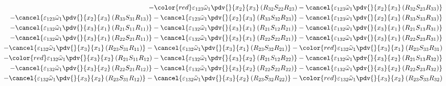 \begin{equation}
\begin{split}
		-{\color{red}\varepsilon_{123}\tilde{\omega}_{1}\pdv{}{x_{2}}{x_{3}}\left(R_{32}S_{22}R_{23}\right)}
		-\cancel{\varepsilon_{123}\tilde{\omega}_{1}\pdv{}{x_{2}}{x_{3}}\left(R_{32}S_{23}R_{33}\right)}\\
		-\cancel{\varepsilon_{123}\tilde{\omega}_{1}\pdv{}{x_{2}}{x_{3}}\left(R_{33}S_{31}R_{13}\right)}
		-\cancel{\varepsilon_{123}\tilde{\omega}_{1}\pdv{}{x_{2}}{x_{3}}\left(R_{33}S_{32}R_{23}\right)}
		-\cancel{\varepsilon_{123}\tilde{\omega}_{1}\pdv{}{x_{2}}{x_{3}}\left(R_{33}S_{33}R_{33}\right)}\\
		-\cancel{\varepsilon_{132}\tilde{\omega}_{1}\pdv{}{x_{3}}{x_{1}}\left(R_{21}S_{11}R_{11}\right)}
		-\cancel{\varepsilon_{132}\tilde{\omega}_{1}\pdv{}{x_{3}}{x_{1}}\left(R_{21}S_{12}R_{21}\right)}
		-\cancel{\varepsilon_{132}\tilde{\omega}_{1}\pdv{}{x_{3}}{x_{1}}\left(R_{21}S_{13}R_{31}\right)}\\
		-\cancel{\varepsilon_{132}\tilde{\omega}_{1}\pdv{}{x_{3}}{x_{1}}\left(R_{22}S_{21}R_{11}\right)}
		-\cancel{\varepsilon_{132}\tilde{\omega}_{1}\pdv{}{x_{3}}{x_{1}}\left(R_{22}S_{22}R_{21}\right)}
		-\cancel{\varepsilon_{132}\tilde{\omega}_{1}\pdv{}{x_{3}}{x_{1}}\left(R_{22}S_{23}R_{31}\right)}\\
		-\cancel{\varepsilon_{132}\tilde{\omega}_{1}\pdv{}{x_{3}}{x_{1}}\left(R_{23}S_{31}R_{11}\right)}
		-\cancel{\varepsilon_{132}\tilde{\omega}_{1}\pdv{}{x_{3}}{x_{1}}\left(R_{23}S_{32}R_{21}\right)}
		-{\color{red}\varepsilon_{132}\tilde{\omega}_{1}\pdv{}{x_{3}}{x_{1}}\left(R_{23}S_{33}R_{31}\right)}\\
		-{\color{red}\varepsilon_{132}\tilde{\omega}_{1}\pdv{}{x_{3}}{x_{2}}\left(R_{21}S_{11}R_{12}\right)}
		-\cancel{\varepsilon_{132}\tilde{\omega}_{1}\pdv{}{x_{3}}{x_{2}}\left(R_{21}S_{12}R_{22}\right)}
		-\cancel{\varepsilon_{132}\tilde{\omega}_{1}\pdv{}{x_{3}}{x_{2}}\left(R_{21}S_{13}R_{32}\right)}\\
		-\cancel{\varepsilon_{132}\tilde{\omega}_{1}\pdv{}{x_{3}}{x_{2}}\left(R_{22}S_{21}R_{12}\right)}
		-\cancel{\varepsilon_{132}\tilde{\omega}_{1}\pdv{}{x_{3}}{x_{2}}\left(R_{22}S_{22}R_{22}\right)}
		-\cancel{\varepsilon_{132}\tilde{\omega}_{1}\pdv{}{x_{3}}{x_{2}}\left(R_{22}S_{23}R_{32}\right)}\\
		-\cancel{\varepsilon_{132}\tilde{\omega}_{1}\pdv{}{x_{3}}{x_{2}}\left(R_{23}S_{31}R_{12}\right)}
		-\cancel{\varepsilon_{132}\tilde{\omega}_{1}\pdv{}{x_{3}}{x_{2}}\left(R_{23}S_{32}R_{22}\right)}
		-{\color{red}\varepsilon_{132}\tilde{\omega}_{1}\pdv{}{x_{3}}{x_{2}}\left(R_{23}S_{33}R_{32}\right)}\\

\end{split}
\end{equation}
